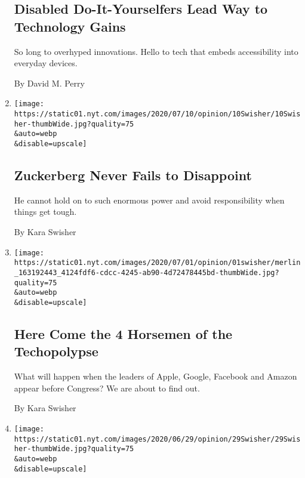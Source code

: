 \begin{enumerate}
{  \subsection{Disabled Do-It-Yourselfers Lead Way to Technology
  Gains}\label{disabled-do-it-yourselfers-lead-way-to-technology-gains}}

  So long to overhyped innovations. Hello to tech that embeds
  accessibility into everyday devices.

  By David M. Perry
\item
  \href{/2020/07/10/opinion/facebook-zuckerberg.html}{}

  \texttt{[image: https://static01.nyt.com/images/2020/07/10/opinion/10Swisher/10Swisher-thumbWide.jpg?quality=75\\\&auto=webp\\\&disable=upscale]}

  \hypertarget{zuckerberg-never-fails-to-disappoint}{%
  \subsection{Zuckerberg Never Fails to
  Disappoint}\label{zuckerberg-never-fails-to-disappoint}}

  He cannot hold on to such enormous power and avoid responsibility when
  things get tough.

  By Kara Swisher
\item
  \href{/2020/07/01/opinion/anti-trust-tech-hearing-facebook.html}{}

  \texttt{[image: https://static01.nyt.com/images/2020/07/01/opinion/01swisher/merlin\_163192443\_4124fdf6-cdcc-4245-ab90-4d72478445bd-thumbWide.jpg?quality=75\\\&auto=webp\\\&disable=upscale]}

  \hypertarget{here-come-the-4-horsemen-of-the-techopolypse}{%
  \subsection{Here Come the 4 Horsemen of the
  Techopolypse}\label{here-come-the-4-horsemen-of-the-techopolypse}}

  What will happen when the leaders of Apple, Google, Facebook and
  Amazon appear before Congress? We are about to find out.

  By Kara Swisher
\item
  \href{/2020/06/30/opinion/facebook-zuckerberg-labeling.html}{}

  \texttt{[image: https://static01.nyt.com/images/2020/06/29/opinion/29Swisher/29Swisher-thumbWide.jpg?quality=75\\\&auto=webp\\\&disable=upscale]}


\end{enumerate}

